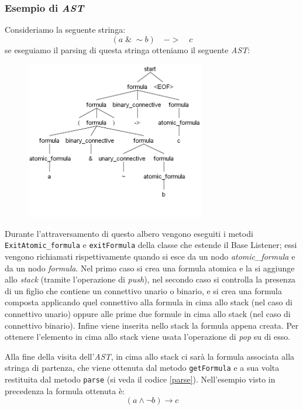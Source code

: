 \documentclass[a4paper,12pt]{report}
\begin{document}
\subsubsection{Esempio di \emph{AST}}
Consideriamo la seguente stringa:
\[ (a \; \& \; \sim b) \quad -> \quad c \]
se eseguiamo il parsing di questa stringa otteniamo il seguente \emph{AST}:
\begin{figure}[H]
    \includegraphics[width=0.7\textwidth, height=0.5\textheight]{img/antlr4_parse_tree.png}
\end{figure}
Durante l'attraversamento di questo albero vengono eseguiti i metodi \\ \texttt{ExitAtomic\_formula} e \texttt{exitFormula} della classe che estende il Base Listener; essi vengono richiamati rispettivamente quando si esce da un nodo \emph{atomic\_formula} e da un nodo \emph{formula}. Nel primo caso si crea una formula atomica e la si aggiunge allo \emph{stack} (tramite l'operazione di \emph{push}), nel secondo caso si controlla la presenza di un figlio che contiene un connettivo unario o binario, e si crea una formula composta applicando quel connettivo alla formula in cima allo stack (nel caso di connettivo unario) oppure alle prime due formule in cima allo stack (nel caso di connettivo binario). Infine viene inserita nello stack la formula appena creata. Per ottenere l'elemento in cima allo stack viene usata l'operazione di \emph{pop} su di esso.

Alla fine della visita dell'\emph{AST}, in cima allo stack ci sarà la formula associata alla stringa di partenza, che viene ottenuta dal metodo \texttt{getFormula} e a sua volta restituita dal metodo \texttt{parse} (si veda il codice \ref{parse}). Nell'esempio visto in precedenza la formula ottenuta è:
\[ (a \land \lnot b) \to c \]
\end{document}
